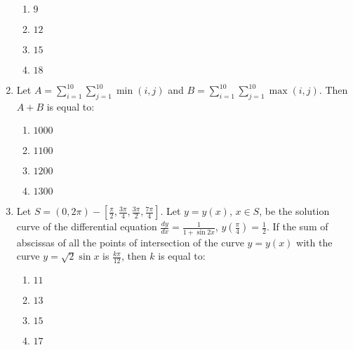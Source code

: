 \documentclass[journal]{IEEEtran}
\newcommand{\brak}[1]{\left( #1 \right)}
\newcommand{\sbrak}[1]{\left[ #1 \right]}
\begin{document}
\begin{enumerate}
        \begin{multicols}{4}
        \begin{enumerate}
        \item $9$
        \item $12$
        \item $15$
        \item $18$
        \end{enumerate}
        \end{multicols}
        
    \item Let $A=\sum_{i=1}^{10}\sum_{j=1}^{10}\min\brak{i,j}$ and $B=\sum_{i=1}^{10}\sum_{j=1}^{10}\max\brak{i,j}$. Then $A+B$ is equal to:
    
        \begin{multicols}{4}
        \begin{enumerate}
        \item $1000$
        \item $1100$
        \item $1200$
        \item $1300$
        \end{enumerate}
        \end{multicols}
        
    \item Let $S=\left(0,2\pi\right)-\sbrak{\frac{\pi}{2},\frac{3\pi}{4},\frac{3\pi}{2},\frac{7\pi}{4}}$. Let $y=y\brak{x}$, $x\in S$, be the solution curve of the differential equation $\frac{dy}{dx}=\frac{1}{1+\sin 2x}$, $y\brak{\frac{\pi}{4}}=\frac{1}{2}$. If the sum of abscissas of all the points of intersection of the curve $y=y\brak{x}$ with the curve $y=\sqrt{2}\sin x$ is $\frac{k\pi}{12}$, then $k$ is equal to:
    
        \begin{multicols}{4}
        \begin{enumerate}
        \item $11$
        \item $13$
        \item $15$
        \item $17$
        \end{enumerate}
        \end{multicols}
        
    

\end{enumerate}   
\end{document}
